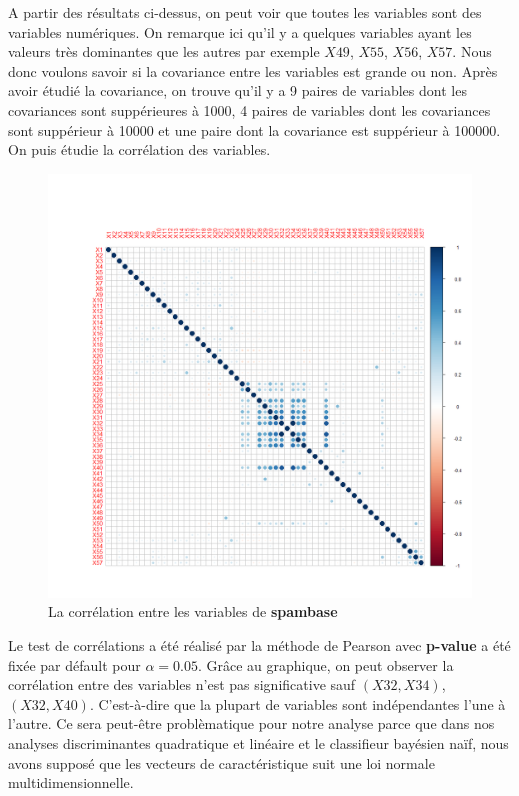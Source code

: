 \documentclass[a4paper,11pt,oneside,roman]{article}
\begin{document}
A partir des résultats ci-dessus, on peut voir que toutes les variables sont des variables numériques. On remarque ici qu'il y a quelques variables ayant les valeurs très dominantes que les autres par exemple $X49$, $X55$, $X56$, $X57$. Nous donc voulons savoir si la covariance entre les variables est grande ou non. Après avoir étudié la covariance, on trouve qu'il y a 9 paires de variables dont les covariances sont suppérieures à 1000, 4 paires de variables dont les covariances sont suppérieur à 10000 et une paire dont la covariance est suppérieur à 100000. On puis étudie la corrélation des variables.
\newline
\begin{figure}[htb]
    \centering
    \includegraphics[scale = .4]{./discrimination/spambase/corrplot.png} 
    \caption{La corrélation entre les variables de \textbf{spambase}}
    \label{my_label}
\end{figure}
Le test de corrélations a été réalisé par la méthode de Pearson avec \textbf{p-value} a été fixée par défault pour $\alpha = 0.05$. Grâce au graphique, on peut observer la corrélation entre des variables n'est pas significative sauf $(X32,X34)$, $(X32,X40)$. C'est-à-dire que la plupart de variables sont indépendantes l'une à l'autre. Ce sera peut-être problèmatique pour notre analyse parce que dans nos analyses discriminantes quadratique et linéaire et le classifieur bayésien naïf, nous avons supposé que les vecteurs de caractéristique suit une loi normale multidimensionnelle.
\end{document}
